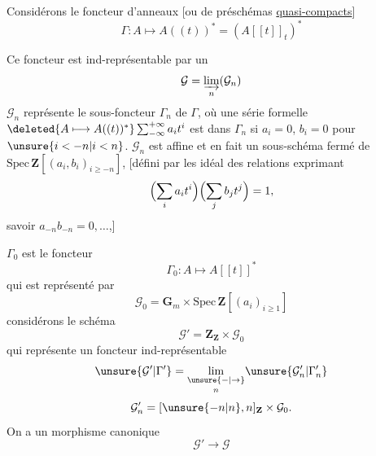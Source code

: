 Considérons le foncteur d'anneaux [ou de préschémas \uline{quasi-compacts}]
\[
\Gamma:A\longmapsto A((t))^*=(A[[t]]_t)^*
\]

Ce foncteur est ind-représentable par un
\[
\mathcal G=\varinjlim_n(\mathcal G_n)
\]
$\mathcal G_n$ représente le sous-foncteur $\Gamma_n$ de $\Gamma$, où une série formelle $\deleted{A\longmapsto A((t))^*}\sum_{-\infty}^{+\infty}a_i t^i$  est dans $\Gamma_n$ si $a_i=0$, $b_i=0$ pour $\unsure{i<-n|i<n}$. $\mathcal G_n$ est affine et en fait un sous-schéma fermé de $\mathrm{Spec}\,\mathbf Z[(a_i,b_i)_{i\geq-n}]$, [défini par les  idéal des relations exprimant
\[
\Bigl(\sum_i a_it^i\Bigr)\Bigl(\sum_j b_jt^j\Bigr)=1,
\]
savoir $a_{-n}b_{-n}=0,\ldots$,]

  $\Gamma_0$ est le foncteur
\[
\Gamma_0:A\longmapsto A[[t]]^*
\]
qui est représenté par
\[
\mathcal G_0=\mathbf G_m\times\mathrm{Spec}\,\mathbf Z[(a_i)_{i\geq1}]
\]
considérons le schéma
\[
\mathcal G'=\mathbf Z_{\mathbf Z}\times\mathcal G_0
\]
qui représente un foncteur ind-représentable
\[
\unsure{\mathcal G'|\Gamma'}=\underset{n}{\underset{\unsure{-|\rightarrow}}{\lim}}\unsure{\mathcal G'_n|\Gamma'_n}
\]
\[
\mathcal G'_n=[\unsure{-n|n},n]_{\mathbf Z}\times\mathcal G_0.
\]
On a un morphisme canonique
\[
\mathcal G'\longrightarrow\mathcal G
\]
